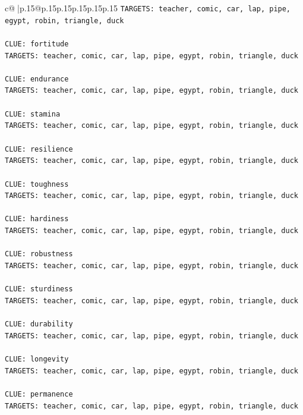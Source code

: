\documentclass{article}
\begin{document}
{\begin{supertabular}{c@{$\;$}|p{.15\linewidth}@{}p{.15\linewidth}p{.15\linewidth}p{.15\linewidth}p{.15\linewidth}p{.15\linewidth}}
{{{\texttt{TARGETS: teacher, comic, car, lap, pipe, egypt, robin, triangle, duck} \\
\\ 
\texttt{CLUE: fortitude} \\
\texttt{TARGETS: teacher, comic, car, lap, pipe, egypt, robin, triangle, duck} \\
\\ 
\texttt{CLUE: endurance} \\
\texttt{TARGETS: teacher, comic, car, lap, pipe, egypt, robin, triangle, duck} \\
\\ 
\texttt{CLUE: stamina} \\
\texttt{TARGETS: teacher, comic, car, lap, pipe, egypt, robin, triangle, duck} \\
\\ 
\texttt{CLUE: resilience} \\
\texttt{TARGETS: teacher, comic, car, lap, pipe, egypt, robin, triangle, duck} \\
\\ 
\texttt{CLUE: toughness} \\
\texttt{TARGETS: teacher, comic, car, lap, pipe, egypt, robin, triangle, duck} \\
\\ 
\texttt{CLUE: hardiness} \\
\texttt{TARGETS: teacher, comic, car, lap, pipe, egypt, robin, triangle, duck} \\
\\ 
\texttt{CLUE: robustness} \\
\texttt{TARGETS: teacher, comic, car, lap, pipe, egypt, robin, triangle, duck} \\
\\ 
\texttt{CLUE: sturdiness} \\
\texttt{TARGETS: teacher, comic, car, lap, pipe, egypt, robin, triangle, duck} \\
\\ 
\texttt{CLUE: durability} \\
\texttt{TARGETS: teacher, comic, car, lap, pipe, egypt, robin, triangle, duck} \\
\\ 
\texttt{CLUE: longevity} \\
\texttt{TARGETS: teacher, comic, car, lap, pipe, egypt, robin, triangle, duck} \\
\\ 
\texttt{CLUE: permanence} \\
\texttt{TARGETS: teacher, comic, car, lap, pipe, egypt, robin, triangle, duck} \\
}}}
\end{supertabular}}
\end{document}
